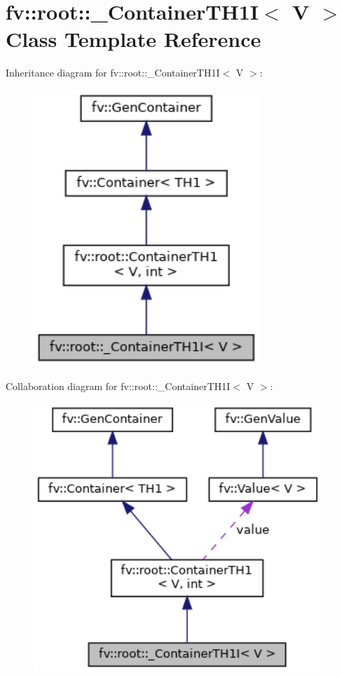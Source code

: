 \hypertarget{classfv_1_1root_1_1__ContainerTH1I}{}\section{fv\+:\+:root\+:\+:\+\_\+\+Container\+T\+H1I$<$ V $>$ Class Template Reference}
\label{classfv_1_1root_1_1__ContainerTH1I}


Inheritance diagram for fv\+:\+:root\+:\+:\+\_\+\+Container\+T\+H1I$<$ V $>$\+:
\nopagebreak
\begin{figure}[H]
\begin{center}
\leavevmode
\includegraphics[width=241pt]{classfv_1_1root_1_1__ContainerTH1I__inherit__graph}
\end{center}
\end{figure}


Collaboration diagram for fv\+:\+:root\+:\+:\+\_\+\+Container\+T\+H1I$<$ V $>$\+:
\nopagebreak
\begin{figure}[H]
\begin{center}
\leavevmode
\includegraphics[width=308pt]{classfv_1_1root_1_1__ContainerTH1I__coll__graph}
\end{center}
\end{figure}
